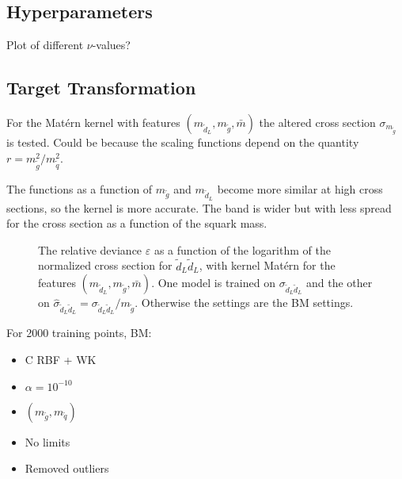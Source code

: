 \documentclass[twoside,english]{uiofysmaster}
\begin{document}
\subsection{Hyperparameters}

Plot of different $\nu$-values?





\subsection{Target Transformation}

For the Mat\'{e}rn kernel with features $(m_{\tilde{d}_L}, m_{\tilde{g}}, \bar{m})$ the altered cross section $\sigma_{m_{\tilde{g}}}$ is tested. Could be because the scaling functions depend on the quantity $r = m_{\tilde{g}}^2/m_{\tilde{q}}^2$.

The functions as a function of $m_{\tilde{g}}$ and $m_{\tilde{d}_L}$ become more similar at high cross sections, so the kernel is more accurate. The band is wider but with less spread for the cross section as a function of the squark mass. 


\begin{figure}[H]
\centering
\caption{The relative deviance $\varepsilon$ as a function of the logarithm of the normalized cross section for $\tilde{d}_L \tilde{d}_L$, with kernel Mat\'{e}rn for the features $(m_{\tilde{d}_L}, m_{\tilde{g}}, \bar{m})$. One model is trained on $\sigma_{\tilde{d}_L \tilde{d}_L}$ and the other on $\hat{\sigma}_{\tilde{d}_L \tilde{d}_L} = \sigma_{\tilde{d}_L \tilde{d}_L}/m_{\tilde{g}}$. Otherwise the settings are the BM settings.}
\end{figure}


For 2000 training points, BM: 
\begin{itemize}
\item C RBF + WK
\item $\alpha = 10^{-10}$
\item $(m_{\tilde{g}}, m_{\tilde{q}})$
\item No limits
\item Removed outliers
\end{itemize}
\end{document}
